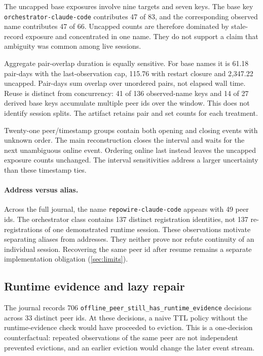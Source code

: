 \documentclass[10pt,twocolumn]{article}
\newcommand{\code}[1]{\texttt{#1}}
\begin{document}
The uncapped base exposures involve nine targets and seven keys. The base key \code{orchestrator-claude-code} contributes 47 of 83, and the corresponding observed name contributes 47 of 66. Uncapped counts are therefore dominated by stale-record exposure and concentrated in one name. They do not support a claim that ambiguity was common among live sessions.

Aggregate pair-overlap duration is equally sensitive. For base names it is 61.18 pair-days with the last-observation cap, 115.76 with restart closure and 2,347.22 uncapped. Pair-days sum overlap over unordered pairs, not elapsed wall time. Reuse is distinct from concurrency: 41 of 136 observed-name keys and 14 of 27 derived base keys accumulate multiple peer ids over the window. This does not identify session splits. The artifact retains pair and set counts for each treatment.

Twenty-one peer/timestamp groups contain both opening and closing events with unknown order. The main reconstruction closes the interval and waits for the next unambiguous online event. Ordering online last instead leaves the uncapped exposure counts unchanged. The interval sensitivities address a larger uncertainty than these timestamp ties.

\paragraph{Address versus alias.}
Across the full journal, the name \code{repowire-claude-code} appears with 49 peer ids. The orchestrator class contains 137 distinct registration identities, not 137 re-registrations of one demonstrated runtime session. These observations motivate separating aliases from addresses. They neither prove nor refute continuity of an individual session. Recovering the same peer id after resume remains a separate implementation obligation (\cref{sec:limits}).

\subsection{Runtime evidence and lazy repair}
\label{sec:repair-evidence}

The journal records 706 \code{offline\_peer\_still\_has\_runtime\_evidence} decisions across 33 distinct peer ids. At these decisions, a naive TTL policy without the runtime-evidence check would have proceeded to eviction. This is a one-decision counterfactual: repeated observations of the same peer are not independent prevented evictions, and an earlier eviction would change the later event stream.
\end{document}
